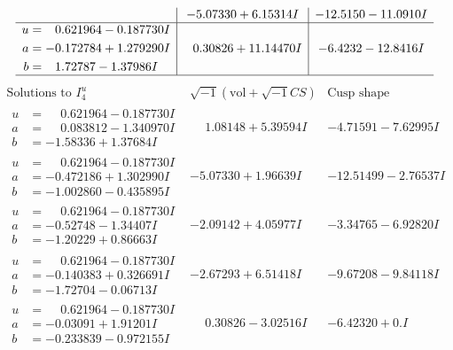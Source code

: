 \documentclass[1p]{elsarticle_modified}
\theoremstyle{definition}
\newcommand{\I}{\sqrt{-1}}
\begin{document}
$$\begin{array}{c|c|c}
 & -5.07330 + 6.15314 I & -12.5150 - 11.0910 I \\ \hline\begin{aligned}
u &= \phantom{-}0.621964 - 0.187730 I \\
a &= -0.172784 + 1.279290 I \\
b &= \phantom{-}1.72787 - 1.37986 I\end{aligned}
 & \phantom{-}0.30826 + 11.14470 I & -6.4232 - 12.8416 I\\
 \hline 
 \end{array}$$\newpage$$\begin{array}{c|c|c}  
\text{Solutions to }I^u_{4}& \I (\text{vol} + \sqrt{-1}CS) & \text{Cusp shape}\\
 \hline 
\begin{aligned}
u &= \phantom{-}0.621964 - 0.187730 I \\
a &= \phantom{-}0.083812 - 1.340970 I \\
b &= -1.58336 + 1.37684 I\end{aligned}
 & \phantom{-}1.08148 + 5.39594 I & -4.71591 - 7.62995 I \\ \hline\begin{aligned}
u &= \phantom{-}0.621964 - 0.187730 I \\
a &= -0.472186 + 1.302990 I \\
b &= -1.002860 - 0.435895 I\end{aligned}
 & -5.07330 + 1.96639 I & -12.51499 - 2.76537 I \\ \hline\begin{aligned}
u &= \phantom{-}0.621964 - 0.187730 I \\
a &= -0.52748 - 1.34407 I \\
b &= -1.20229 + 0.86663 I\end{aligned}
 & -2.09142 + 4.05977 I & -3.34765 - 6.92820 I \\ \hline\begin{aligned}
u &= \phantom{-}0.621964 - 0.187730 I \\
a &= -0.140383 + 0.326691 I \\
b &= -1.72704 - 0.06713 I\end{aligned}
 & -2.67293 + 6.51418 I & -9.67208 - 9.84118 I \\ \hline\begin{aligned}
u &= \phantom{-}0.621964 - 0.187730 I \\
a &= -0.03091 + 1.91201 I \\
b &= -0.233839 - 0.972155 I\end{aligned}
 & \phantom{-}0.30826 - 3.02516 I & -6.42320 + 0. I\phantom{ +0.000000I} \\ \hline\begin{aligned}

\end{aligned}
\end{array}$$
\end{document}
